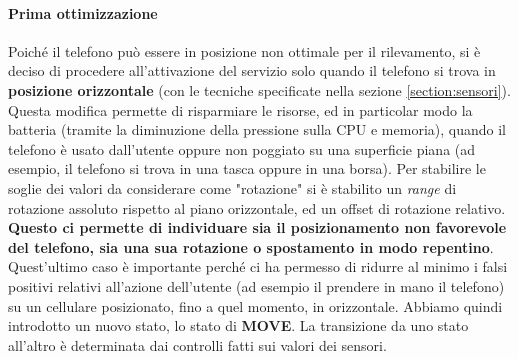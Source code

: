 \documentclass[a4paper,10pt]{memoir}
\begin{document}
\paragraph{Prima ottimizzazione} Poiché il telefono può essere in posizione non ottimale per il rilevamento, si è deciso di procedere all'attivazione del servizio solo quando il telefono si trova in \textbf{posizione orizzontale} (con le tecniche specificate nella sezione \ref{section:sensori}). Questa modifica permette di risparmiare le risorse, ed in particolar modo la batteria (tramite la diminuzione della pressione sulla CPU e memoria), quando il telefono è usato dall'utente oppure non poggiato su una superficie piana (ad esempio, il telefono si trova in una tasca oppure in una borsa). Per stabilire le soglie dei valori da considerare come "rotazione" si è stabilito un \textit{range} di rotazione assoluto rispetto al piano orizzontale, ed un offset di rotazione relativo. \textbf{Questo ci permette di individuare sia il posizionamento non favorevole del telefono, sia una sua rotazione o spostamento in modo repentino}. Quest'ultimo caso è importante perché ci ha permesso di ridurre al minimo i falsi positivi relativi all'azione dell'utente (ad esempio il prendere in mano il telefono) su un cellulare posizionato, fino a quel momento, in orizzontale. Abbiamo quindi introdotto un nuovo stato, lo stato di \textbf{MOVE}. La transizione da uno stato all'altro è determinata dai controlli fatti sui valori dei sensori.
\end{document}

